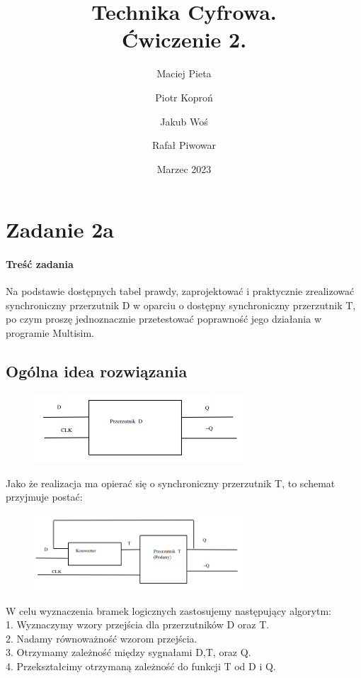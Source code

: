 \documentclass{article}
\author{Maciej Pieta \and Piotr Koproń \and Jakub Woś \and Rafał Piwowar}
\date{Marzec 2023}
\title{Technika Cyfrowa. \\ Ćwiczenie 2.}
\begin{document}
\maketitle
\newpage

\section{Zadanie 2a}
\paragraph{Treść zadania} Na podstawie dostępnych tabel prawdy, zaprojektować i praktycznie zrealizować synchroniczny przerzutnik D w oparciu o dostępny synchroniczny przerzutnik T, po czym proszę jednoznacznie przetestować poprawność jego działania w programie Multisim. 
\subsection{Ogólna idea rozwiązania}
\begin{figure}[H]
\includegraphics[width=0.7\textwidth]{DBB}
\end{figure}
Jako że realizacja ma opierać się o synchroniczny przerzutnik T, to schemat przyjmuje postać:
\begin{figure}[H]
\includegraphics[width=0.7\textwidth]{KBB}
\end{figure}
W celu wyznaczenia bramek logicznych zastosujemy następujący algorytm: \\
1. Wyznaczymy wzory przejścia dla przerzutników D oraz T. \\
2. Nadamy równoważność wzorom przejścia. \\
3. Otrzymamy zależność między sygnałami D,T, oraz Q. \\
4. Przekształcimy otrzymaną zależność do funkcji T od D i Q. \\
\newpage
\end{document}
